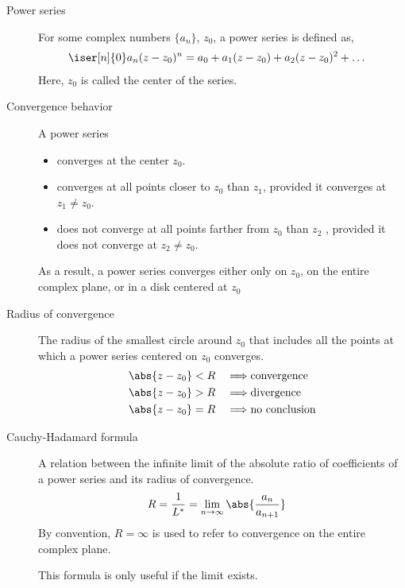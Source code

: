\begin{description}
    \item[Power series] For some complex numbers $ \{a_n\} $, $ z_0 $, a power series is
        defined as,
        \begin{align}
            \iser[n]{0} a_n(z - z_0)^n & = a_0 + a_1 (z - z_0) + a_2
            (z - z_0)^2 + \dots
        \end{align}
        Here, $ z_0 $ is called the center of the series.

    \item[Convergence behavior] A power series
        \begin{itemize}
            \item converges at the center $ z_0 $.
            \item converges at all points closer to $ z_0 $ than $ z_1 $, provided it
                  converges at $ z_1 \neq z_0 $.
            \item does not converge at all points farther from $ z_0 $ than $ z_2 $
                  , provided it does not converge at $ z_2 \neq z_0 $.
        \end{itemize}
        As a result, a power series converges either only on $ z_0 $, on the entire
        complex plane, or in a disk centered at $ z_0 $

    \item[Radius of convergence] The radius of the smallest circle around $ z_0 $ that
        includes all the points at which a power series centered on $ z_0 $ converges.
        \begin{align}
            \abs{z - z_0} & < R & \implies & \text{convergence}   \\
            \abs{z - z_0} & > R & \implies & \text{divergence}    \\
            \abs{z - z_0} & = R & \implies & \text{no conclusion}
        \end{align}

    \item[Cauchy-Hadamard formula] A relation between the infinite limit of the
        absolute ratio of coefficients of a power series and its radius of convergence.
        \begin{align}
            R & = \frac{1}{L^*} = \lim_{n \to \infty} \abs{\frac{a_n}{a_{n+1}}}
        \end{align}
        By convention, $ R = \infty $ is used to refer to convergence on the entire
        complex plane. \par
        This formula is only useful if the limit exists.
\end{description}

